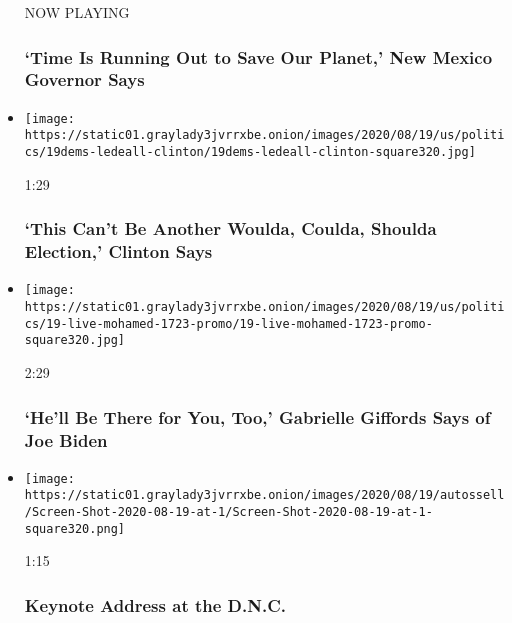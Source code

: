 \begin{itemize}
  NOW PLAYING

  \hypertarget{time-is-running-out-to-save-our-planet-new-mexico-governor-says-2}{%
  \subsubsection{`Time Is Running Out to Save Our Planet,' New Mexico
  Governor
  Says}\label{time-is-running-out-to-save-our-planet-new-mexico-governor-says-2}}
\item
  \href{https://www.nytimes3xbfgragh.onion/video/us/elections/100000007297618/hillary-clinton-speaks-dnc.html?action=click\&module=video-series-bar\&region=header\&pgtype=Article\&playlistId=video/2020-Elections}{}

  \texttt{[image: https://static01.graylady3jvrrxbe.onion/images/2020/08/19/us/politics/19dems-ledeall-clinton/19dems-ledeall-clinton-square320.jpg]}

  1:29

  \hypertarget{this-cant-be-another-woulda-coulda-shoulda-election-clinton-says}{%
  \subsubsection{`This Can't Be Another Woulda, Coulda, Shoulda
  Election,' Clinton
  Says}\label{this-cant-be-another-woulda-coulda-shoulda-election-clinton-says}}
\item
  \href{https://www.nytimes3xbfgragh.onion/video/us/elections/100000007297620/gabrielle-giffords-speaks-dnc.html?action=click\&module=video-series-bar\&region=header\&pgtype=Article\&playlistId=video/2020-Elections}{}

  \texttt{[image: https://static01.graylady3jvrrxbe.onion/images/2020/08/19/us/politics/19-live-mohamed-1723-promo/19-live-mohamed-1723-promo-square320.jpg]}

  2:29

  \hypertarget{hell-be-there-for-you-too-gabrielle-giffords-says-of-joe-biden}{%
  \subsubsection{`He'll Be There for You, Too,' Gabrielle Giffords Says
  of Joe
  Biden}\label{hell-be-there-for-you-too-gabrielle-giffords-says-of-joe-biden}}
\item
  \href{https://www.nytimes3xbfgragh.onion/video/us/politics/100000007296108/keynote-address-dnc.html?action=click\&module=video-series-bar\&region=header\&pgtype=Article\&playlistId=video/2020-Elections}{}

  \texttt{[image: https://static01.graylady3jvrrxbe.onion/images/2020/08/19/autossell/Screen-Shot-2020-08-19-at-1/Screen-Shot-2020-08-19-at-1-square320.png]}

  1:15

  \hypertarget{keynote-address-at-the-dnc}{%
  \subsubsection{Keynote Address at the
  D.N.C.}\label{keynote-address-at-the-dnc}}
\end{itemize}

